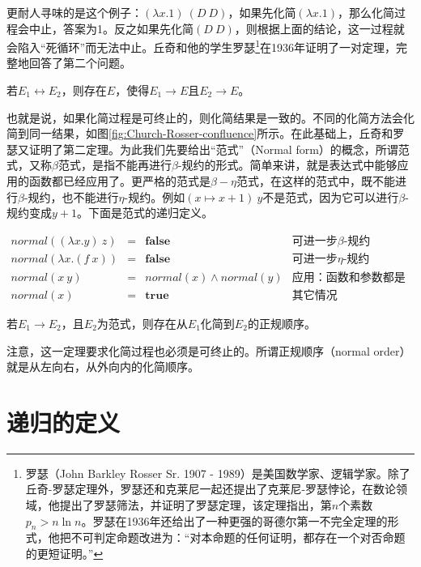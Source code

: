 \documentclass{article}
\begin{document}
更耐人寻味的是这个例子：$(\lambda x . 1)\ (D\ D)$，如果先化简$(\lambda x . 1)$，那么化简过程会中止，答案为1。反之如果先化简$(D\ D)$，则根据上面的结论，这一过程就会陷入“死循环”而无法中止。丘奇和他的学生罗瑟\footnote{罗瑟（John Barkley Rosser Sr. 1907 - 1989）是美国数学家、逻辑学家。除了丘奇-罗瑟定理外，罗瑟还和克莱尼一起还提出了克莱尼-罗瑟悖论，在数论领域，他提出了罗瑟筛法，并证明了罗瑟定理，该定理指出，第$n$个素数$p_n > n \ln n$。罗瑟在1936年还给出了一种更强的哥德尔第一不完全定理的形式，他把不可判定命题改进为：“对本命题的任何证明，都存在一个对否命题的更短证明。”}在1936年证明了一对定理，完整地回答了第二个问题。

\begin{theorem}[丘奇-罗瑟定理一]
若$E_1 \leftrightarrow E_2$，则存在$E$，使得$E_1 \to E$且$E_2 \to E$。
\end{theorem}

也就是说，如果化简过程是可终止的，则化简结果是一致的。不同的化简方法会化简到同一结果，如图\ref{fig:Church-Rosser-confluence}所示。在此基础上，丘奇和罗瑟又证明了第二定理。为此我们先要给出“范式”（Normal form）的概念，所谓范式，又称$\beta$范式，是指不能再进行$\beta$-规约的形式。简单来讲，就是表达式中能够应用的函数都已经应用了。更严格的范式是$\beta-\eta$范式，在这样的范式中，既不能进行$\beta$-规约，也不能进行$\eta$-规约。例如$(x \mapsto x + 1)\ y$不是范式，因为它可以进行$\beta$-规约变成$y + 1$。下面是范式的递归定义。

\[
\begin{array}{rcll}
normal((\lambda x . y)\ z) & = & \textbf{false} & \text{可进一步$\beta$-规约} \\
normal(\lambda x . (f\ x)) & = & \textbf{false} & \text{可进一步$\eta$-规约} \\
normal(x\ y) & = & normal(x) \land normal(y) & \text{应用：函数和参数都是范式} \\
normal(x) & = & \textbf{true} & \text{其它情况}
\end{array}
\]

\begin{theorem}[丘奇-罗瑟定理二]
若$E_1 \to E_2$，且$E_2$为范式，则存在从$E_1$化简到$E_2$的正规顺序。
\end{theorem}

注意，这一定理要求化简过程也必须是可终止的。所谓正规顺序（normal order）就是从左向右，从外向内的化简顺序。

\section{递归的定义}
\end{document}
